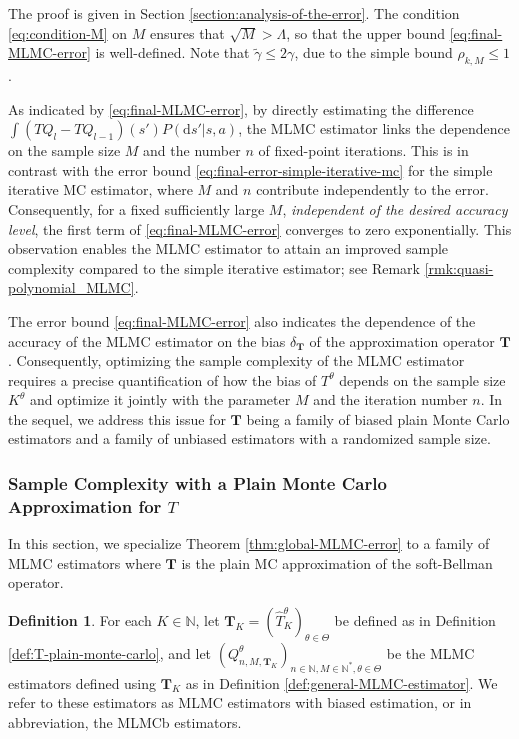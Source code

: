 \documentclass[11pt]{article}
\numberwithin{equation}{section}
\theoremstyle{definition}
\newtheorem{definition}{Definition}[section]
\theoremstyle{remark}
\def\d{{\mathrm{d}}}
\def\N{{\mathbb{N}}}
\begin{document}
The proof is given in Section \ref{section:analysis-of-the-error}.
The condition \eqref{eq:condition-M}  on $M$   ensures that $\sqrt{M} > \Lambda$, so that the upper bound \eqref{eq:final-MLMC-error} is well-defined.
Note that $\tilde \gamma \le 2\gamma$,
  due to the simple bound  $\rho_{k,M}\le 1$. 
 


As indicated by \eqref{eq:final-MLMC-error}, by directly estimating the difference $\int (T Q_{l} - T Q_{l-1})(s') P(\d s'|s,a)$, the MLMC estimator links the dependence on the sample size $M$  and the number $n$ of fixed-point iterations. This is in contrast with the error bound \eqref{eq:final-error-simple-iterative-mc} for the simple iterative MC estimator, where 
$M$ and $n$
 contribute independently to the error.  
Consequently, 
for a fixed sufficiently large $M$, \emph{independent of the desired accuracy level}, 
the first term of 
\eqref{eq:final-MLMC-error}
converges to zero exponentially.
This observation enables the MLMC estimator to attain    an improved sample complexity compared to the simple iterative estimator;
see Remark \ref{rmk:quasi-polynomial_MLMC}.



The error bound \eqref{eq:final-MLMC-error} also indicates the  dependence of the accuracy of the MLMC estimator on the  bias \( \delta_{\mathbf{T}} \) of the  approximation operator \( \mathbf{T} \).  
Consequently, optimizing the sample complexity of the MLMC estimator requires a precise quantification of how the bias of $T^\theta$ depends on the sample size $K^\theta$  
 and optimize it jointly with the parameter  $M$  and the iteration number $n$. In the sequel, we address this issue for $\mathbf T$ being a family of   biased  plain Monte Carlo estimators  
   and a family of unbiased estimators with a randomized sample size.


 
 
\subsubsection{Sample Complexity with a Plain Monte Carlo Approximation for \texorpdfstring{$T$}{T}}
\label{subsection:plain-monte-carlo}

 

In this section, we specialize Theorem \ref{thm:global-MLMC-error}
to a family of MLMC estimators
where $\mathbf T$ is the
plain MC approximation 
of the soft-Bellman operator.

\begin{definition}
    For each $K\in \N$,
    let $ \mathbf{T}_K = (\hat T^\theta_K)_{\theta \in \Theta}$ be defined as in Definition \ref{def:T-plain-monte-carlo},
    and let 
    $({Q}_{n,M, \mathbf{T}_K}^{\theta})_{n\in \N, M\in \N^*,\theta\in \Theta}$ be the MLMC estimators  defined using $ \mathbf{T}_K$ as in 
        Definition \ref{def:general-MLMC-estimator}.
We refer to these estimators as MLMC estimators with biased estimation, or in abbreviation, the MLMCb estimators.
        
\end{definition}
\end{document}
